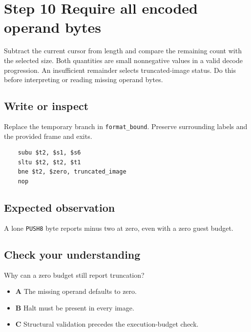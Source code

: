 \section{Step 10 Require all encoded operand bytes}\label{vm-s10}

Subtract the current cursor from length and compare the remaining count with the selected size. Both quantities are small nonnegative values in a valid decode progression. An insufficient remainder selects truncated-image status. Do this before interpreting or reading missing operand bytes.

\subsection{Write or inspect}
Replace the temporary branch in \texttt{format\_bound}. Preserve surrounding labels and the provided frame and exits.

\begin{verbatim}
    subu $t2, $s1, $s6
    sltu $t2, $t2, $t1
    bne $t2, $zero, truncated_image
    nop
\end{verbatim}
\subsection{Expected observation}
A lone \texttt{PUSH8} byte reports minus two at zero, even with a zero guest budget.

\subsection{Check your understanding}
Why can a zero budget still report truncation?

\begin{itemize}
  \item \textbf{A} The missing operand defaults to zero.
  \item \textbf{B} Halt must be present in every image.
  \item \textbf{C} Structural validation precedes the execution-budget check.
\end{itemize}
